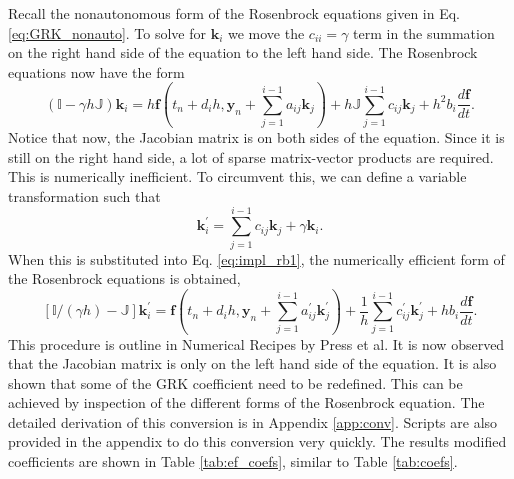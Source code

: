 \documentclass{ansconf}
\numberwithin{equation}{section}
\begin{document}
 \label{sec:impl}

Recall the nonautonomous form of the Rosenbrock equations given in Eq. \eqref{eq:GRK_nonauto}. To solve for $\mathbf{k}_i$ we move the $c_{ii} = \gamma$ term in the summation on the right hand side of the equation to the left hand side. The Rosenbrock equations now have the form
\begin{equation} \label{eq:impl_rb1}
    \left(\mathbb{I} - \gamma h \mathbb{J}\right)\mathbf{k}_{i} = h\mathbf{f} \left(t_n + d_ih,\mathbf{y}_n + \sum_{j=1}^{i-1}a_{ij}\mathbf{k}_{j}\right) 
                   + h\mathbb{J}\sum_{j=1}^{i-1} c_{ij}\mathbf{k}_{j}  + h^2b_i\frac{d\mathbf{f}}{dt}.
\end{equation}
Notice that now, the Jacobian matrix is on both sides of the equation. Since it is still on the right hand side, a lot of sparse matrix-vector products are required. This is numerically inefficient. To circumvent this, we can define a variable transformation such that
\begin{equation}
	\mathbf{k}^\prime_i=\sum_{j=1}^{i-1}c_{ij}\mathbf{k}_j + \gamma\mathbf{k}_i.
\end{equation}
When this is substituted into Eq. \ref{eq:impl_rb1}, the numerically efficient form of the Rosenbrock equations is obtained,
\begin{equation}
    \left[\mathbb{I}/\left(\gamma h\right) - \mathbb{J}\right]\mathbf{k}^\prime_{i} = \mathbf{f} \left(t_n + d_ih,\mathbf{y}_n + \sum_{j=1}^{i-1}a^\prime_{ij}\mathbf{k}^\prime_{j}\right) 
                   + \frac{1}{h}\sum_{j=1}^{i-1} c^\prime_{ij}\mathbf{k}^\prime_{j}  + hb_i\frac{d\mathbf{f}}{dt}.
\end{equation}
This procedure is outline in Numerical Recipes by Press et al. It is now observed that the Jacobian matrix is only on the left hand side of the equation. It is also shown that some of the GRK coefficient need to be redefined. This can be achieved by inspection of the different forms of the Rosenbrock equation. The detailed derivation of this conversion is in Appendix \ref{app:conv}. Scripts are also provided in the appendix to do this conversion very quickly. The results modified coefficients are shown in Table \ref{tab:ef_coefs}, similar to Table \ref{tab:coefs}. 
\end{document}
